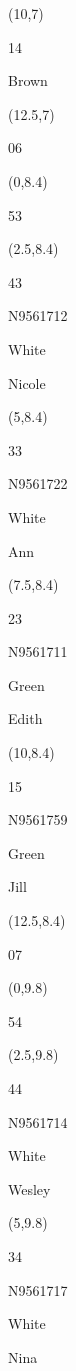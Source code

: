 \documentclass[a4paper]{article}
\newcommand{\myseat}[4]{%
\vspace{-0.1cm}
\parbox[t][2.2cm][t]{3.5cm}{
\small #1 %
\begin{description}
\vspace{-0.1cm}
\item [ID:] #2
\vspace{-0.1cm}
\item [Team:] #3 \normalsize
\vspace{-0.1cm}
\item \normalsize #4
\vspace{-0.1cm}
\end{description}
}
}
\begin{document}
\begin{CJK}{UTF8}{cyberbit}
\begin{textblock}{2.5}(10,7)
\myseat{14}{}{Brown}{}
\end{textblock}

\begin{textblock}{2.5}(12.5,7)
\textblockcolor{}
\myseat{06}{}{}{}
\end{textblock}

\begin{textblock}{2.5}(0,8.4)
\textblockcolor{}
\myseat{53}{}{}{}
\end{textblock}

\begin{textblock}{2.5}(2.5,8.4)
\myseat{43}{N9561712}{White}{Nicole}
\end{textblock}

\begin{textblock}{2.5}(5,8.4)
\myseat{33}{N9561722}{White}{Ann}
\end{textblock}

\begin{textblock}{2.5}(7.5,8.4)
\myseat{23}{N9561711}{Green}{Edith}
\end{textblock}

\begin{textblock}{2.5}(10,8.4)
\myseat{15}{N9561759}{Green}{Jill}
\end{textblock}

\begin{textblock}{2.5}(12.5,8.4)
\textblockcolor{}
\myseat{07}{}{}{}
\end{textblock}

\begin{textblock}{2.5}(0,9.8)
\textblockcolor{}
\myseat{54}{}{}{}
\end{textblock}

\begin{textblock}{2.5}(2.5,9.8)
\myseat{44}{N9561714}{White}{Wesley}
\end{textblock}

\begin{textblock}{2.5}(5,9.8)
\myseat{34}{N9561717}{White}{Nina}
\end{textblock}


\end{CJK}
\end{document}
